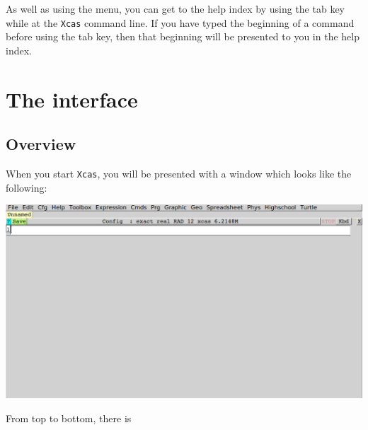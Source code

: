 \documentclass{article}
\begin{document}
As well as using the menu, you can get to the help 
index by using the
tab key while at the \texttt{Xcas} command line.  If you have typed
the beginning of a command before using the tab key, then that
beginning will be presented to you in the help index.

\section{The interface}

\subsection{Overview}

When you start \texttt{Xcas}, you will be presented with a window which
looks like the following:
\begin{center}
\includegraphics[width=\textwidth]{xcas-open.png}
\end{center}
From top to bottom, there is
\end{document}
